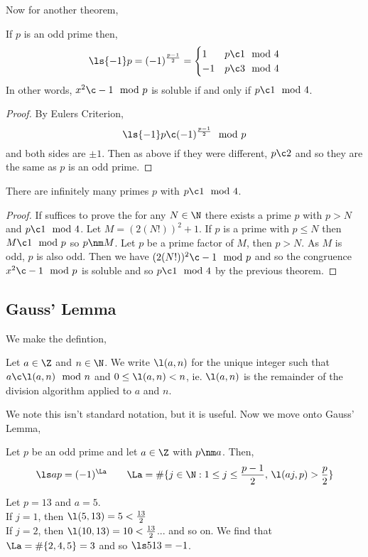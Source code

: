 Now for another theorem,
\begin{nthm}
  If $p$ is an odd prime then,
  $$ \ls{-1} p = (-1)^{\frac{p-1}{2}} = \begin{cases}
    1 & p \c 1 \mod 4 \\
    -1 & p \c 3 \mod 4
  \end{cases} $$
  In other words, $x^2 \c -1 \mod p$ is soluble if and only if $p \c 1 \mod 4$.
\end{nthm}
\begin{proof}
  By Eulers Criterion,
  $$ \ls{-1} p \c (-1)^{\frac{p-1}{2}} \mod p $$
  and both sides are $\pm 1$. Then as above if they were different, $p \c 2$ and so they are the same as $p$ is an odd prime.
\end{proof}

\begin{nthm}
  There are infinitely many primes $p$ with $p \c 1 \mod 4$.
\end{nthm}
\begin{proof}
  If suffices to prove the for any $N \in \N$ there exists a prime $p$ with $p > N$ and $p \c 1 \mod 4$. Let $M = (2(N!))^2 + 1$. If $p$ is a prime with $p \le N$ then $M \c 1 \mod p$ so $p \nm M$. Let $p$ be a prime factor of $M$, then $p > N$. As $M$ is odd, $p$ is also odd. Then we have $(2(N!))^2 \c -1 \mod p$ and so the congruence $x^2 \c -1 \mod p$ is soluble and so $p \c 1 \mod 4$ by the previous theorem.
\end{proof}

\subsection{Gauss' Lemma}
We make the defintion,
\begin{ndefi}[]
  Let $a \in \Z$ and $n \in \N$. We write $\l(a, n)$ for the unique integer such that $a \c \l(a, n)\mod n$ and $0 \le \l(a, n) < n$, ie. $\l(a, n)$ is the remainder of the division algorithm applied to $a$ and $n$.
\end{ndefi}

We note this isn't standard notation, but it is useful. Now we move onto Gauss' Lemma,
\begin{nthm}
  Let $p$ be an odd prime and let $a \in \Z$ with $p \nm a$. Then,
  $$ \ls a p = (-1)^\La \qquad \La = \#\{ j \in \N : 1 \le j \le \frac{p-1}{2},\, \l(aj, p) > \frac{p}{2}\}$$
\end{nthm}

\begin{eg}
  Let $p = 13$ and $a = 5$.\\
  If $j = 1$, then $\l(5, 13) = 5 < \frac{13}{2}$\\
  If $j = 2$, then $\l(10, 13) = 10 < \frac{13}{2}$... and so on. We find that $\La = \#\{2, 4, 5\} = 3$ and so $\ls 5 13 = -1$.
\end{eg}

